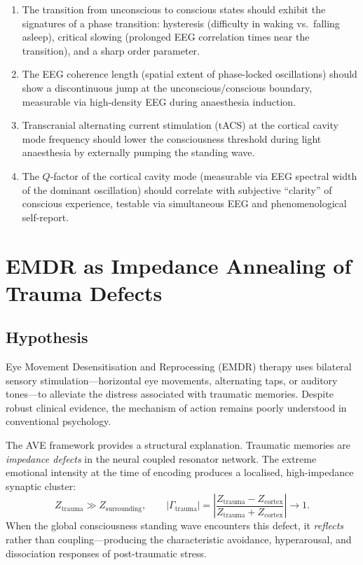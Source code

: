 \begin{enumerate}
  \item The transition from unconscious to conscious states should
        exhibit the signatures of a phase transition: hysteresis
        (difficulty in waking vs.\ falling asleep), critical
        slowing (prolonged EEG correlation times near the
        transition), and a sharp order parameter.
  \item The EEG coherence length (spatial extent of phase-locked
        oscillations) should show a discontinuous jump at the
        unconscious/conscious boundary, measurable via
        high-density EEG during anaesthesia induction.
  \item Transcranial alternating current stimulation (tACS) at the
        cortical cavity mode frequency should lower the
        consciousness threshold during light anaesthesia by
        externally pumping the standing wave.
  \item The $Q$-factor of the cortical cavity mode (measurable via
        EEG spectral width of the dominant oscillation) should
        correlate with subjective ``clarity'' of conscious
        experience, testable via simultaneous EEG and
        phenomenological self-report.
\end{enumerate}


\section{EMDR as Impedance Annealing of Trauma Defects}
\label{sec:emdr}

\subsection{Hypothesis}

Eye Movement Desensitisation and Reprocessing (EMDR) therapy uses
bilateral sensory stimulation---horizontal eye movements, alternating
taps, or auditory tones---to alleviate the distress associated with
traumatic memories.  Despite robust clinical evidence, the
mechanism of action remains poorly understood in conventional
psychology.

The AVE framework provides a structural explanation.  Traumatic
memories are \emph{impedance defects} in the neural coupled
resonator network.  The extreme emotional intensity at the time
of encoding produces a localised, high-impedance synaptic
cluster:
\begin{equation}
  Z_{\mathrm{trauma}} \gg Z_{\mathrm{surrounding}},
  \qquad
  |\Gamma_{\mathrm{trauma}}|
  = \left|\frac{Z_{\mathrm{trauma}} - Z_{\mathrm{cortex}}}
               {Z_{\mathrm{trauma}} + Z_{\mathrm{cortex}}}
  \right| \to 1.
\end{equation}
When the global consciousness standing wave encounters this defect,
it \emph{reflects} rather than coupling---producing the
characteristic avoidance, hyperarousal, and dissociation responses
of post-traumatic stress.

